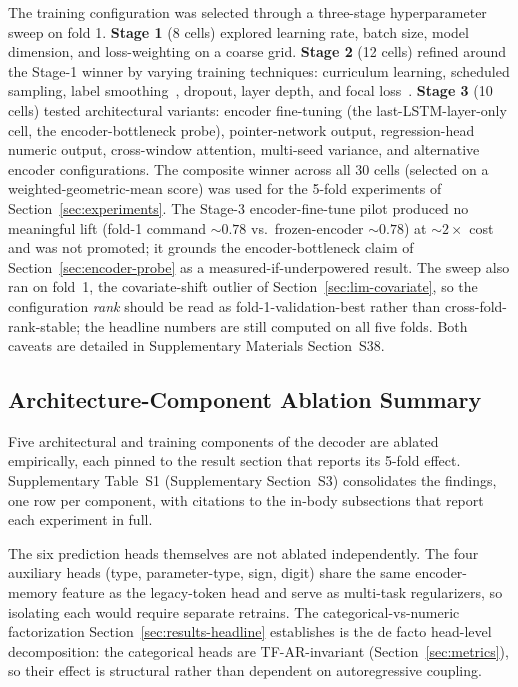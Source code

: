 \documentclass[sensors,article,submit,moreauthors,pdftex]{Definitions/mdpi}
\begin{document}
The training configuration was selected through a three-stage hyperparameter sweep on fold 1.
\textbf{Stage 1} (8 cells) explored learning rate, batch size, model dimension, and loss-weighting on a coarse grid.
\textbf{Stage 2} (12 cells) refined around the Stage-1 winner by varying training techniques: curriculum learning, scheduled sampling, label smoothing~\cite{szegedy2016inception}, dropout, layer depth, and focal loss~\cite{focal_loss}.
\textbf{Stage 3} (10 cells) tested architectural variants: encoder fine-tuning (the last-LSTM-layer-only cell, the encoder-bottleneck probe), pointer-network output, regression-head numeric output, cross-window attention, multi-seed variance, and alternative encoder configurations. The composite winner across all 30 cells (selected on a weighted-geometric-mean score) was used for the 5-fold experiments of Section~\ref{sec:experiments}. The Stage-3 encoder-fine-tune pilot produced no meaningful lift (fold-1 command $\sim\!0.78$ vs.\ frozen-encoder $\sim\!0.78$) at $\sim\!2\times$ cost and was not promoted; it grounds the encoder-bottleneck claim of Section~\ref{sec:encoder-probe} as a measured-if-underpowered result. The sweep also ran on fold~1, the covariate-shift outlier of Section~\ref{sec:lim-covariate}, so the configuration \emph{rank} should be read as fold-1-validation-best rather than cross-fold-rank-stable; the headline numbers are still computed on all five folds. Both caveats are detailed in Supplementary Materials Section~S38.

\subsection{Architecture-Component Ablation Summary}
\label{sec:arch-ablation-summary}

Five architectural and training components of the decoder are ablated empirically, each pinned to the result section that reports its 5-fold effect. Supplementary Table~S1 (Supplementary Section~S3) consolidates the findings, one row per component, with citations to the in-body subsections that report each experiment in full.

The six prediction heads themselves are not ablated independently. The four auxiliary heads (type, parameter-type, sign, digit) share the same encoder-memory feature as the legacy-token head and serve as multi-task regularizers, so isolating each would require separate retrains. The categorical-vs-numeric factorization Section~\ref{sec:results-headline} establishes is the de facto head-level decomposition: the categorical heads are TF-AR-invariant (Section~\ref{sec:metrics}), so their effect is structural rather than dependent on autoregressive coupling.
\end{document}
